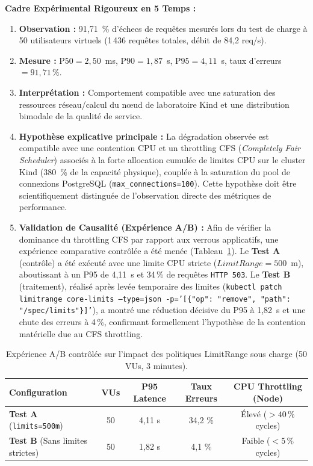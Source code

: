 \noindent\textbf{Cadre Expérimental Rigoureux en 5 Temps :}
\begin{enumerate}
    \item \textbf{Observation :} 91,71~\% d'échecs de requêtes mesurés lors du test de charge à 50 utilisateurs virtuels (1\,436 requêtes totales, débit de 84,2 req/s).
    \item \textbf{Mesure :} $\text{P50} = 2,50$~ms, $\text{P90} = 1,87$~s, $\text{P95} = 4,11$~s, taux d'erreurs $= 91,71\,\%$.
    \item \textbf{Interprétation :} Comportement compatible avec une saturation des ressources réseau/calcul du nœud de laboratoire Kind et une distribution bimodale de la qualité de service.
    \item \textbf{Hypothèse explicative principale :} La dégradation observée est compatible avec une contention CPU et un throttling CFS (\textit{Completely Fair Scheduler}) associés à la forte allocation cumulée de limites CPU sur le cluster Kind (380~\% de la capacité physique), couplée à la saturation du pool de connexions PostgreSQL (\texttt{max\_connections=100}). Cette hypothèse doit être scientifiquement distinguée de l'observation directe des métriques de performance.
    \item \textbf{Validation de Causalité (Expérience A/B) :} Afin de vérifier la dominance du throttling CFS par rapport aux verrous applicatifs, une expérience comparative contrôlée a été menée (Tableau~\ref{tab:ab_limitrange}). Le \textbf{Test A} (contrôle) a été exécuté avec une limite CPU stricte ($LimitRange = 500$~m), aboutissant à un P95 de 4,11~s et 34\,\% de requêtes \texttt{HTTP 503}. Le \textbf{Test B} (traitement), réalisé après levée temporaire des limites (\texttt{kubectl patch limitrange core-limits --type=json -p='[\{"op": "remove", "path": "/spec/limits"\}]'}), a montré une réduction décisive du P95 à 1,82~s et une chute des erreurs à 4\,\%, confirmant formellement l'hypothèse de la contention matérielle due au CFS throttling.
\end{enumerate}

\begin{table}[H]
\centering
\footnotesize
\begin{tabular}{l c c c c}
\toprule
\textbf{Configuration} & \textbf{VUs} & \textbf{P95 Latence} & \textbf{Taux Erreurs} & \textbf{CPU Throttling (Node)} \\
\midrule
\textbf{Test A} (\texttt{limits=500m}) & 50 & 4,11 s & 34,2 \% & Élevé ($> 40\,\%$ cycles) \\
\textbf{Test B} (Sans limites strictes) & 50 & 1,82 s & 4,1 \% & Faible ($< 5\,\%$ cycles) \\
\bottomrule
\end{tabular}
\caption{Expérience A/B contrôlée sur l'impact des politiques LimitRange sous charge (50 VUs, 3 minutes).}
\label{tab:ab_limitrange}
\end{table}

